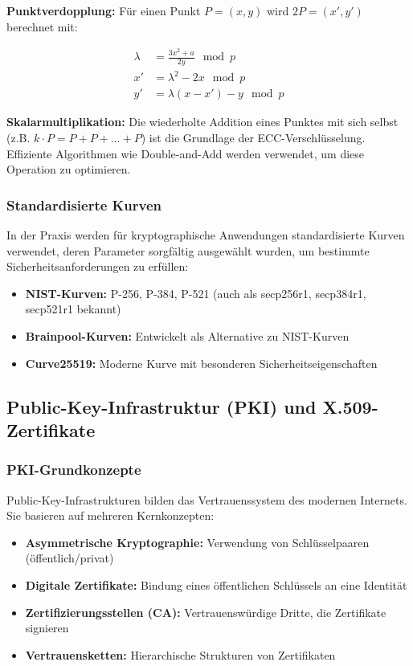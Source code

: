 \documentclass{article}
\begin{document}
\textbf{Punktverdopplung:} Für einen Punkt \(P = (x, y)\) wird \(2P = (x', y')\) berechnet mit:

\begin{align}
\lambda &= \frac{3x^2 + a}{2y} \mod p \\
x' &= \lambda^2 - 2x \mod p \\
y' &= \lambda(x - x') - y \mod p
\end{align}

\textbf{Skalarmultiplikation:} Die wiederholte Addition eines Punktes mit sich selbst (z.B. \(k \cdot P = P + P + \ldots + P\)) ist die Grundlage der ECC-Verschlüsselung. Effiziente Algorithmen wie Double-and-Add werden verwendet, um diese Operation zu optimieren.

\subsubsection{Standardisierte Kurven}
In der Praxis werden für kryptographische Anwendungen standardisierte Kurven verwendet, deren Parameter sorgfältig ausgewählt wurden, um bestimmte Sicherheitsanforderungen zu erfüllen:

\begin{itemize}
  \item \textbf{NIST-Kurven:} P-256, P-384, P-521 (auch als secp256r1, secp384r1, secp521r1 bekannt)
  \item \textbf{Brainpool-Kurven:} Entwickelt als Alternative zu NIST-Kurven
  \item \textbf{Curve25519:} Moderne Kurve mit besonderen Sicherheitseigenschaften
\end{itemize}

\subsection{Public-Key-Infrastruktur (PKI) und X.509-Zertifikate}

\subsubsection{PKI-Grundkonzepte}
Public-Key-Infrastrukturen bilden das Vertrauenssystem des modernen Internets. Sie basieren auf mehreren Kernkonzepten:

\begin{itemize}
  \item \textbf{Asymmetrische Kryptographie:} Verwendung von Schlüsselpaaren (öffentlich/privat)
  \item \textbf{Digitale Zertifikate:} Bindung eines öffentlichen Schlüssels an eine Identität
  \item \textbf{Zertifizierungsstellen (CA):} Vertrauenswürdige Dritte, die Zertifikate signieren
  \item \textbf{Vertrauensketten:} Hierarchische Strukturen von Zertifikaten
\end{itemize}
\end{document}
